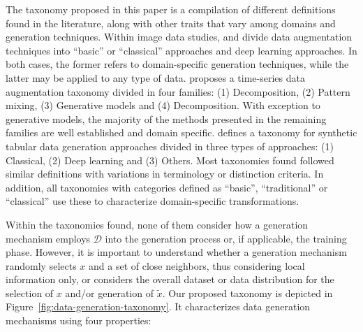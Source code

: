 \documentclass[parskip=full]{scrartcl}
\begin{document}
The taxonomy proposed in this paper is a compilation of different definitions
found in the literature, along with other traits that vary among domains and
generation techniques. Within image data studies, \citet{shorten2019survey}
and \citet{khalifa2021comprehensive} divide data augmentation techniques into
``basic'' or ``classical'' approaches and deep learning approaches. In both
cases, the former refers to domain-specific generation techniques, while the
latter may be applied to any type of data. \citet{iwana2021empirical} proposes
a time-series data augmentation taxonomy divided in four families: (1)
Decomposition, (2) Pattern mixing, (3) Generative models and (4)
Decomposition. With exception to generative models, the majority of the
methods presented in the remaining families are well established and domain
specific. \citet{hernandez2022synthetic} defines a taxonomy for synthetic
tabular data generation approaches divided in three types of approaches: (1)
Classical, (2) Deep learning and (3) Others. Most taxonomies found followed
similar definitions with variations in terminology or distinction criteria. In
addition, all taxonomies with categories defined as ``basic'', ``traditional''
or ``classical'' use these to characterize domain-specific transformations.

Within the taxonomies found, none of them consider how a generation
mechanism employs $\mathcal{D}$ into the generation process or, if
applicable, the training phase. However, it is important to understand whether
a generation mechanism randomly selects $x$ and a set of close neighbors, thus
considering local information only, or considers the overall dataset or data
distribution for the selection of $x$ and/or generation of $\tilde{x}$. Our
proposed taxonomy is depicted in Figure~\ref{fig:data-generation-taxonomy}. It
characterizes data generation mechanisms using four properties:
\end{document}
